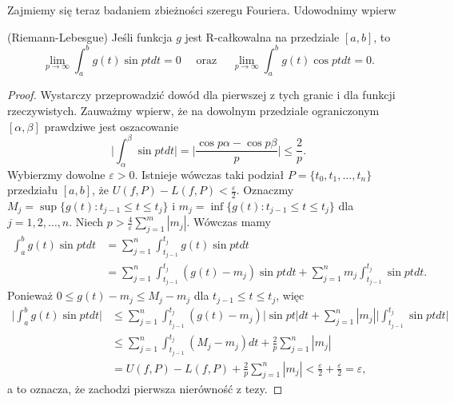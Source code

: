 \documentclass[leqno]{article}
\newcounter{lematcounter}
\begin{document}
\begin{justify}
Zajmiemy się teraz badaniem zbieżności szeregu Fouriera. Udowodnimy wpierw

\setcounter{lematcounter}{3}
\begin{lemat}
{
    (Riemann-Lebesgue) Jeśli funkcja $g$ jest R-całkowalna na przedziale $[a,b]$, to 
    \[
        \lim_{p \to \infty}\int_{a}^{b}g(t) \sin pt dt = 0 \quad \text{ oraz } \quad \lim_{p \to \infty}\int_{a}^{b}g(t) \cos pt dt = 0.
    \]
}
\end{lemat}

\begin{proof}
    Wystarczy przeprowadzić dowód dla pierwszej z tych granic i dla funkcji rzeczywistych. Zauważmy wpierw, że na dowolnym przedziale ograniczonym $[\alpha, \beta]$ prawdziwe jest oszacowanie
    \[
        \Bigg| \int_{\alpha}^{\beta} \sin pt dt \Bigg| = \Bigg| \frac{\cos p\alpha - \cos p \beta}{p} \Bigg| \leqslant \frac{2}{p}.
    \]
    Wybierzmy dowolne $\varepsilon > 0$. Istnieje wówczas taki podział $P = \{t_0, t_1, \ldots, t_n\}$ przedziału $[a,b]$, że 
    $U(f, P) - L(f, P) < \frac{\varepsilon}{2}$. Oznaczmy $M_j = \sup\{g(t) : t_{j-1} \leqslant t \leqslant t_j\}$ i $m_j = \inf\{g(t) : t_{j-1} \leqslant t \leqslant t_j\}$
    dla $j = 1, 2, \ldots, n$. Niech $p > \frac{4}{\varepsilon}\sum\limits_{j=1}^{m}|m_j|$. Wówczas mamy
    \begin{align*}
        \int_{a}^{b}g(t)\sin pt dt &= \sum_{j=1}^{n}\int_{t_{j-1}}^{t_j} g(t) \sin pt dt \\
                                    &= \sum_{j=1}^{n} \int_{t_{j-1}}^{t_j}(g(t) - m_j)\sin pt dt + \sum_{j=1}^{n}m_j \int_{t_{j-1}}^{t_j} \sin pt dt.
    \end{align*}
    Ponieważ $0 \leqslant g(t) - m_j \leqslant M_j - m_j$ dla $t_{j-1} \leqslant t \leqslant t_j$, więc 
    \begin{align*}
        \Bigg| \int_{a}^{b}g(t)\sin pt dt \Bigg| &\leqslant \sum_{j=1}^{n}\int_{t_{j-1}}^{t_j} (g(t) - m_j) |\sin pt| dt + \sum_{j=1}^{n}|m_j| \Bigg| \int_{t_{j-1}}^{t_j} \sin pt dt\Bigg| \\
        &\leqslant \sum_{j=1}^{n}\int_{t_{j-1}}^{t_j}(M_j - m_j)dt + \frac{2}{p}\sum_{j=1}^{n}|m_j| \\ 
        &= U(f, P) - L(f, P) + \frac{2}{p}\sum_{j=1}^{n}|m_j| < \frac{\varepsilon}{2} + \frac{\varepsilon}{2} = \varepsilon,
    \end{align*}
    a to oznacza, że zachodzi pierwsza nierówność z tezy.
\end{proof} 


\end{justify}
\end{document}
